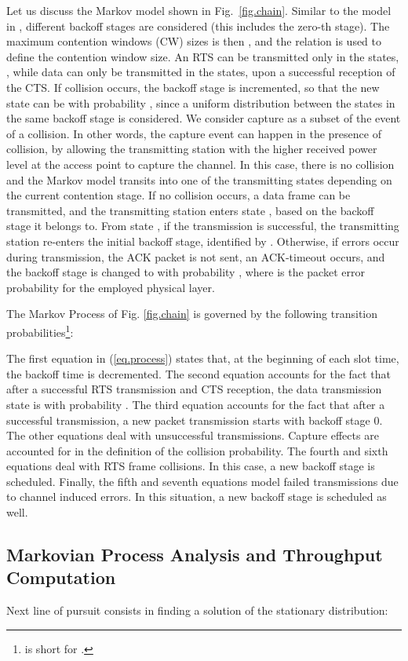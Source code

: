 \documentclass[10pt,onecolumn,a4paper]{IEEEtran}
\begin{document}
Let us discuss the Markov model shown in Fig.~\ref{fig.chain}.
Similar to the model in \cite{Bianchi},  different backoff
stages are considered (this includes the zero-th stage). The
maximum contention windows (CW) sizes is then ,
and the relation  is used to define the 
contention window size. An RTS can be transmitted only in the
 states, , while data can only be
transmitted in the  states,  upon a
successful reception of the CTS. If collision occurs, the backoff
stage is incremented, so that the new state can be  with
probability , since a uniform distribution
between the states in the same backoff stage is considered. We
consider capture as a subset of the event of a collision. In other
words, the capture event can happen in the presence of collision,
by allowing the transmitting station with the higher received
power level at the access point to capture the channel. In this
case, there is no collision and the Markov model transits into one
of the transmitting states  depending on the current
contention stage. If no collision occurs, a data frame can be
transmitted, and the transmitting station enters state ,
based on the backoff stage it belongs to. From state , if
the transmission is successful, the transmitting station re-enters
the initial backoff stage, identified by . Otherwise, if
errors occur during transmission, the ACK packet is not sent, an
ACK-timeout occurs, and the backoff stage is changed to 
with probability , where  is the packet error
probability for the employed physical layer.

The Markov Process of Fig. \ref{fig.chain} is governed by the
following transition probabilities\footnote{ is short
for .}:

The first equation in (\ref{eq.process}) states that, at the
beginning of each slot time, the backoff time is decremented. The
second equation accounts for the fact that after a successful RTS
transmission and CTS reception, the data transmission state is
 with probability . The third
equation accounts for the fact that after a successful
transmission, a new packet transmission starts with backoff stage
0. The other equations deal with unsuccessful transmissions.
Capture effects are accounted for in the definition of the
collision probability. The fourth and sixth equations deal with
RTS frame collisions. In this case, a new backoff stage is
scheduled. Finally, the fifth and seventh equations model failed
transmissions due to channel induced errors. In this situation, a
new backoff stage is scheduled as well.
\subsection{Markovian Process Analysis and Throughput Computation}
Next line of pursuit consists in finding a solution of
the stationary distribution:
\end{document}
